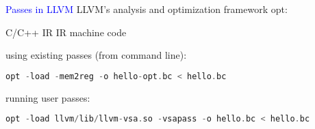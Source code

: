 \begin{frame}[fragile]{\textcolor{blue}{Passes in LLVM}}
LLVM's analysis and optimization framework {\color{blue} opt}:

\begin{center}
C/C++ 
IR
IR
machine code
\end{center}

\vspace{-0.3cm}

\hspace{4.4cm}

\vspace{0.9cm}

using existing passes (from command line):
\begin{footnotesize}
\begin{lstlisting}[language=C++]
opt -load -mem2reg -o hello-opt.bc < hello.bc
\end{lstlisting}
\end{footnotesize}
running user passes:
\begin{footnotesize}
\begin{lstlisting}[language=C++]
opt -load llvm/lib/llvm-vsa.so -vsapass -o hello.bc < hello.bc
\end{lstlisting}
\end{footnotesize}

\end{frame}

